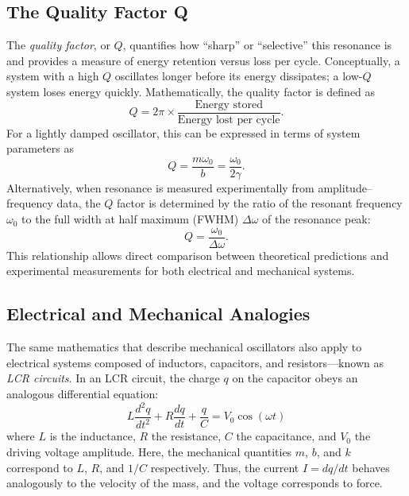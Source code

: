\documentclass[
	a4paper, %
	10pt, %
	twoside, %
]{journal}
\begin{document}
\subsection{The Quality Factor Q}
The \textit{quality factor}, or $Q$, quantifies how ``sharp'' or ``selective'' this resonance is and provides a measure of energy retention versus loss per cycle. Conceptually, a system with a high $Q$ oscillates longer before its energy dissipates; a low-$Q$ system loses energy quickly. Mathematically, the quality factor is defined as 
\begin{equation}
Q = 2\pi \times \frac{\text{Energy stored}}{\text{Energy lost per cycle}}.
\end{equation}
For a lightly damped oscillator, this can be expressed in terms of system parameters as
\begin{equation}
Q = \frac{m\omega_0}{b} = \frac{\omega_0}{2\gamma}.
\end{equation}
Alternatively, when resonance is measured experimentally from amplitude--frequency data, the $Q$ factor is determined by the ratio of the resonant frequency $\omega_0$ to the full width at half maximum (FWHM) $\Delta\omega$ of the resonance peak:
\begin{equation}
Q = \frac{\omega_0}{\Delta\omega}.
\label{eq:qdefinition}
\end{equation}
This relationship allows direct comparison between theoretical predictions and experimental measurements for both electrical and mechanical systems.  

\subsection{Electrical and Mechanical Analogies}
The same mathematics that describe mechanical oscillators also apply to electrical systems composed of inductors, capacitors, and resistors---known as \textit{LCR circuits}. In an LCR circuit, the charge $q$ on the capacitor obeys an analogous differential equation:
\begin{equation}
L\frac{d^2q}{dt^2} + R\frac{dq}{dt} + \frac{q}{C} = V_0 \cos(\omega t)
\label{eq:lcr}
\end{equation}
where $L$ is the inductance, $R$ the resistance, $C$ the capacitance, and $V_0$ the driving voltage amplitude. Here, the mechanical quantities $m$, $b$, and $k$ correspond to $L$, $R$, and $1/C$ respectively. Thus, the current $I = dq/dt$ behaves analogously to the velocity of the mass, and the voltage corresponds to force.  
\end{document}
